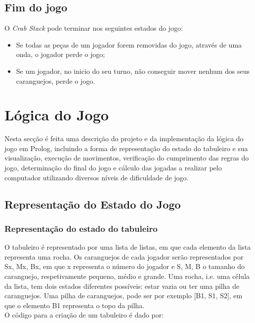 \documentclass[a4paper]{article}
\begin{document}
\subsection{Fim do jogo}

O \textit{Crab Stack} pode terminar nos seguintes estados do jogo:
\begin{itemize}
\item Se todas as peças de um jogador forem removidas do jogo, através de uma onda, o jogador perde o jogo;
\item Se um jogador, no inicio do seu turno, não conseguir mover nenhum dos seus caranguejos, perde o jogo.
\end{itemize}

\newpage

\section{Lógica do Jogo}

Nesta secção é feita uma descrição do projeto e da implementação da lógica do jogo em Prolog, incluindo a forma de representação do estado do tabuleiro e sua visualização, execução de movimentos, verificação do cumprimento das regras do jogo, determinação do final do jogo e cálculo das jogadas a realizar pelo computador utilizando diversos níveis de dificuldade de jogo. 

\subsection{Representação do Estado do Jogo}

\subsubsection{Representação do estado do tabuleiro}

O tabuleiro é representado por uma lista de listas, em que cada elemento da lista representa uma rocha. Os caranguejos de cada jogador serão representados por Sx, Mx, Bx, em que x representa o número do jogador e S, M, B o tamanho do caranguejo, respetivamente pequeno, médio e grande. Uma rocha, i.e. uma célula da lista, tem dois estados diferentes possíveis: estar vazia ou ter uma pilha de caranguejos. Uma pilha de caranguejos, pode ser por exemplo [B1, S1, S2], em que o elemento B1 representa o topo da pilha.
\\O código para a criação de um tabuleiro é dado por:
\end{document}
